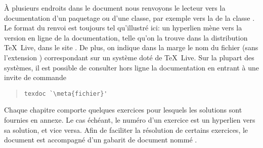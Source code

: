 À plusieurs endroits dans le document nous renvoyons le lecteur vers
la documentation d'un paquetage ou d'une classe, par exemple vers la %
de la classe . Le format du renvoi est toujours tel
qu'illustré ici: un hyperlien mène vers la version en ligne de la
documentation, telle qu'on la trouve dans la distribution {\TeX}~Live,
dans le site %
. De plus, on indique dans la
marge le nom du fichier (sans l'extension ) correspondant
sur un système doté de {\TeX}~Live. Sur la plupart des systèmes, il
est possible de consulter hors ligne la documentation
 en entrant à une invite de commande
\begin{quote}
\begin{lstlisting}[backgroundcolor=\color{white}]
texdoc `\meta{fichier}'
\end{lstlisting}
\end{quote}


Chaque chapitre comporte quelques exercices pour lesquels les solutions
sont fournies en annexe. Le cas échéant, le numéro d'un exercice est
un hyperlien vers sa solution, et vice versa. Afin de faciliter la
résolution de certains exercices, le document est accompagné d'un
gabarit de document nommé .



